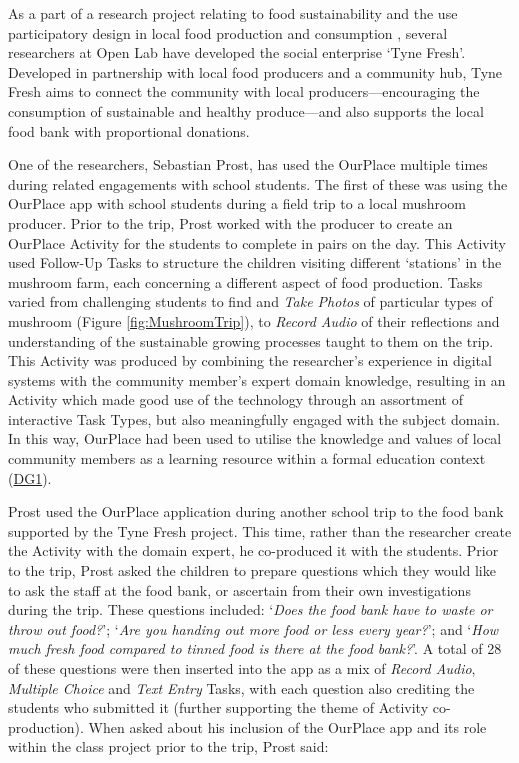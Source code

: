 As a part of a research project relating to food sustainability and the use participatory design in local food production and consumption \citep{Prost2019}, several researchers at Open Lab have developed the social enterprise `Tyne Fresh'. Developed in partnership with local food producers and a community hub, Tyne Fresh aims to connect the community with local producers---encouraging the consumption of sustainable and healthy produce---and also supports the local food bank with proportional donations.

One of the researchers, Sebastian Prost, has used the OurPlace multiple times during related engagements with school students. The first of these was using the OurPlace app with school students during a field trip to a local mushroom producer. Prior to the trip, Prost worked with the producer to create an OurPlace Activity for the students to complete in pairs on the day. This Activity used Follow-Up Tasks to structure the children visiting different `stations' in the mushroom farm, each concerning a different aspect of food production. Tasks varied from challenging students to find and \textit{Take Photos} of particular types of mushroom (Figure \ref{fig:MushroomTrip}), to \textit{Record Audio} of their reflections and understanding of the sustainable growing processes taught to them on the trip. This Activity was produced by combining the researcher's experience in digital systems with the community member's expert domain knowledge, resulting in an Activity which made good use of the technology through an assortment of interactive Task Types, but also meaningfully engaged with the subject domain. In this way, OurPlace had been used to utilise the knowledge and values of local community members as a learning resource within a formal education context (\hyperref[DG1]{DG1}).

Prost used the OurPlace application during another school trip to the food bank supported by the Tyne Fresh project. This time, rather than the researcher create the Activity with the domain expert, he co-produced it with the students. Prior to the trip, Prost asked the children to prepare questions which they would like to ask the staff at the food bank, or ascertain from their own investigations during the trip. These questions included: `\textit{Does the food bank have to waste or throw out food?}'; `\textit{Are you handing out more food or less every year?}'; and `\textit{How much fresh food compared to tinned food is there at the food bank?}'. A total of 28 of these questions were then inserted into the app as a mix of \textit{Record Audio}, \textit{Multiple Choice} and \textit{Text Entry} Tasks, with each question also crediting the students who submitted it (further supporting the theme of Activity co-production). When asked about his inclusion of the OurPlace app and its role within the class project prior to the trip, Prost said:

